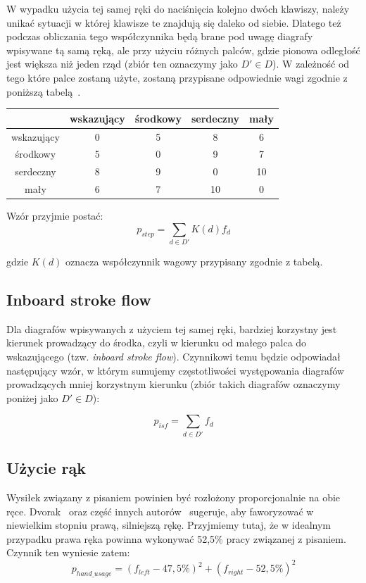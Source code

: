 \documentclass{xmgr}
\begin{document}
W wypadku użycia tej samej ręki do naciśnięcia kolejno dwóch klawiszy, należy unikać sytuacji w której klawisze te znajdują się daleko od siebie. Dlatego też podczas obliczania tego współczynnika będą brane pod uwagę diagrafy wpisywane tą samą ręką, ale przy użyciu różnych palców, gdzie pionowa odległość jest większa niż jeden rząd (zbiór ten oznaczymy jako $ D' \in D $). W zależność od tego które palce zostaną użyte, zostaną przypisane odpowiednie wagi zgodnie z poniższą tabelą~\cite{Eggers2003672}.\newline

\begin{tabular}{ c | c | c | c | c }
  & wskazujący & środkowy & serdeczny & mały \\
  \hline
  wskazujący & 0 & 5 & 8 & 6 \\
  środkowy & 5 & 0 & 9 & 7 \\
  serdeczny & 8 & 9 & 0 & 10 \\
  mały & 6 & 7 & 10 & 0 \\
\end{tabular}\newline\newline

Wzór przyjmie postać:
$$ p_{step} = \sum\limits_{d \in D'} K(d) f_d $$

gdzie $K(d)$ oznacza współczynnik wagowy przypisany zgodnie z tabelą.


\subsection{Inboard stroke flow}

Dla diagrafów wpisywanych z użyciem tej samej ręki, bardziej korzystny jest kierunek prowadzący do środka, czyli w kierunku od małego palca do wskazującego (tzw. \emph{inboard stroke flow}). Czynnikowi temu będzie odpowiadał następujący wzór, w którym sumujemy częstotliwości występowania diagrafów prowadzących mniej korzystnym kierunku (zbiór takich diagrafów oznaczymy poniżej jako $ D' \in D $):

$$ p_{isf} = \sum\limits_{d \in D'} f_d $$


\subsection{Użycie rąk}

Wysiłek związany z pisaniem powinien być rozłożony proporcjonalnie na obie ręce. Dvorak~\cite{cassingham1986dvorak} oraz część innych autorów~\cite{Call:2005:CME} sugeruje, aby faworyzować w niewielkim stopniu prawą, silniejszą rękę. Przyjmiemy tutaj, że w idealnym przypadku prawa ręka powinna wykonywać 52,5\% pracy związanej z pisaniem. Czynnik ten wyniesie zatem:
$$ p_{hand\_usage} = (f_{left} - 47,5\%)^2 + (f_{right} - 52,5\%)^2 $$
\end{document}
